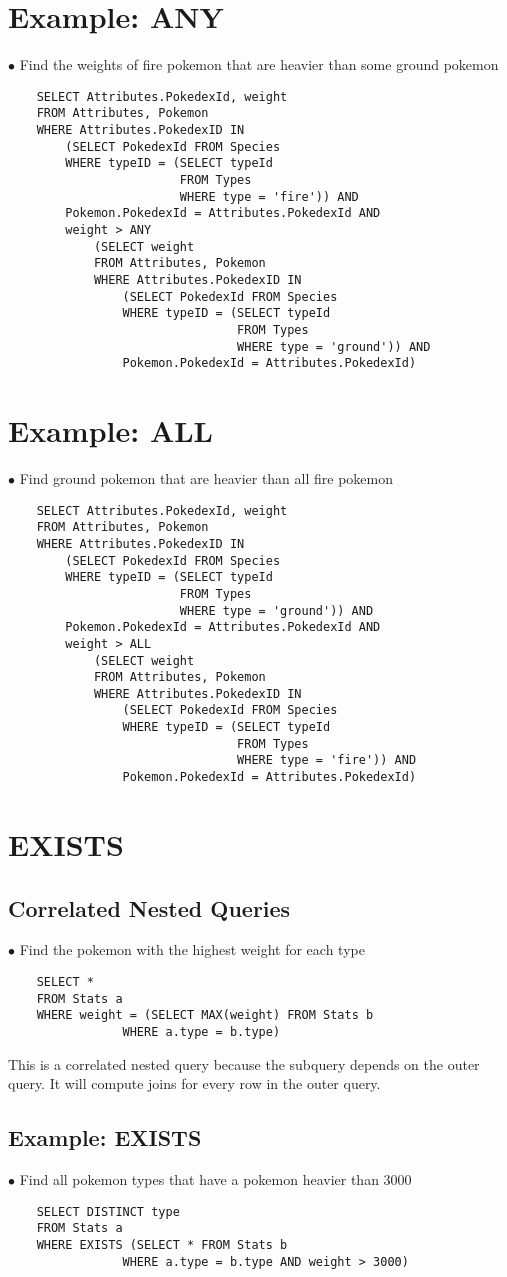 \documentclass[twoside]{article}
\begin{document}
\section*{Example: ANY}
$\bullet$ Find the weights of fire pokemon that are heavier than some ground
pokemon
\begin{verbatim}
    SELECT Attributes.PokedexId, weight
    FROM Attributes, Pokemon
    WHERE Attributes.PokedexID IN
        (SELECT PokedexId FROM Species
        WHERE typeID = (SELECT typeId
                        FROM Types 
                        WHERE type = 'fire')) AND 
        Pokemon.PokedexId = Attributes.PokedexId AND
        weight > ANY
            (SELECT weight
            FROM Attributes, Pokemon
            WHERE Attributes.PokedexID IN
                (SELECT PokedexId FROM Species
                WHERE typeID = (SELECT typeId
                                FROM Types 
                                WHERE type = 'ground')) AND 
                Pokemon.PokedexId = Attributes.PokedexId)
\end{verbatim}

\section*{Example: ALL}
$\bullet$ Find ground pokemon that are heavier than all fire pokemon
\begin{verbatim}
    SELECT Attributes.PokedexId, weight
    FROM Attributes, Pokemon
    WHERE Attributes.PokedexID IN
        (SELECT PokedexId FROM Species
        WHERE typeID = (SELECT typeId
                        FROM Types 
                        WHERE type = 'ground')) AND 
        Pokemon.PokedexId = Attributes.PokedexId AND
        weight > ALL
            (SELECT weight
            FROM Attributes, Pokemon
            WHERE Attributes.PokedexID IN
                (SELECT PokedexId FROM Species
                WHERE typeID = (SELECT typeId
                                FROM Types 
                                WHERE type = 'fire')) AND 
                Pokemon.PokedexId = Attributes.PokedexId)
\end{verbatim}

\section*{EXISTS}
\subsection*{Correlated Nested Queries}
$\bullet$ Find the pokemon with the highest weight for each type
\begin{verbatim}
    SELECT *
    FROM Stats a
    WHERE weight = (SELECT MAX(weight) FROM Stats b
                WHERE a.type = b.type)
\end{verbatim}
This is a correlated nested query because the subquery depends on the outer
query. It will compute joins for every row in the outer query.

\subsection*{Example: EXISTS}
$\bullet$ Find all pokemon types that have a pokemon heavier than 3000
\begin{verbatim}
    SELECT DISTINCT type
    FROM Stats a
    WHERE EXISTS (SELECT * FROM Stats b
                WHERE a.type = b.type AND weight > 3000)
\end{verbatim}
\end{document}
